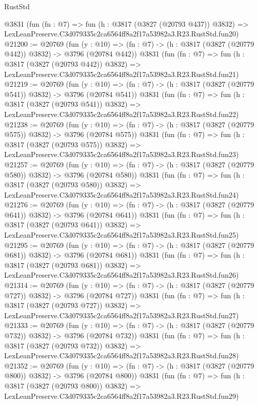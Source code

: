 \begin{lexlean}{RustStd}
\begin{coremodule}
    @3831
    (fun (fn : @7) =>
    fun (h : @3817 (@3827 (@20793 @437)) @3832) =>
    LexLeanPreserve.C3d079335c2ca6564ff8a2f17a53982a3.R23.RustStd.fun20)
@21200 := @20769
    (fun (y : @10) => (fn : @7) -> (h : @3817 (@3827 (@20779 @442)) @3832) -> @3796 (@20784 @442))
    @3831
    (fun (fn : @7) =>
    fun (h : @3817 (@3827 (@20793 @442)) @3832) =>
    LexLeanPreserve.C3d079335c2ca6564ff8a2f17a53982a3.R23.RustStd.fun21)
@21219 := @20769
    (fun (y : @10) => (fn : @7) -> (h : @3817 (@3827 (@20779 @541)) @3832) -> @3796 (@20784 @541))
    @3831
    (fun (fn : @7) =>
    fun (h : @3817 (@3827 (@20793 @541)) @3832) =>
    LexLeanPreserve.C3d079335c2ca6564ff8a2f17a53982a3.R23.RustStd.fun22)
@21238 := @20769
    (fun (y : @10) => (fn : @7) -> (h : @3817 (@3827 (@20779 @575)) @3832) -> @3796 (@20784 @575))
    @3831
    (fun (fn : @7) =>
    fun (h : @3817 (@3827 (@20793 @575)) @3832) =>
    LexLeanPreserve.C3d079335c2ca6564ff8a2f17a53982a3.R23.RustStd.fun23)
@21257 := @20769
    (fun (y : @10) => (fn : @7) -> (h : @3817 (@3827 (@20779 @580)) @3832) -> @3796 (@20784 @580))
    @3831
    (fun (fn : @7) =>
    fun (h : @3817 (@3827 (@20793 @580)) @3832) =>
    LexLeanPreserve.C3d079335c2ca6564ff8a2f17a53982a3.R23.RustStd.fun24)
@21276 := @20769
    (fun (y : @10) => (fn : @7) -> (h : @3817 (@3827 (@20779 @641)) @3832) -> @3796 (@20784 @641))
    @3831
    (fun (fn : @7) =>
    fun (h : @3817 (@3827 (@20793 @641)) @3832) =>
    LexLeanPreserve.C3d079335c2ca6564ff8a2f17a53982a3.R23.RustStd.fun25)
@21295 := @20769
    (fun (y : @10) => (fn : @7) -> (h : @3817 (@3827 (@20779 @681)) @3832) -> @3796 (@20784 @681))
    @3831
    (fun (fn : @7) =>
    fun (h : @3817 (@3827 (@20793 @681)) @3832) =>
    LexLeanPreserve.C3d079335c2ca6564ff8a2f17a53982a3.R23.RustStd.fun26)
@21314 := @20769
    (fun (y : @10) => (fn : @7) -> (h : @3817 (@3827 (@20779 @727)) @3832) -> @3796 (@20784 @727))
    @3831
    (fun (fn : @7) =>
    fun (h : @3817 (@3827 (@20793 @727)) @3832) =>
    LexLeanPreserve.C3d079335c2ca6564ff8a2f17a53982a3.R23.RustStd.fun27)
@21333 := @20769
    (fun (y : @10) => (fn : @7) -> (h : @3817 (@3827 (@20779 @732)) @3832) -> @3796 (@20784 @732))
    @3831
    (fun (fn : @7) =>
    fun (h : @3817 (@3827 (@20793 @732)) @3832) =>
    LexLeanPreserve.C3d079335c2ca6564ff8a2f17a53982a3.R23.RustStd.fun28)
@21352 := @20769
    (fun (y : @10) => (fn : @7) -> (h : @3817 (@3827 (@20779 @800)) @3832) -> @3796 (@20784 @800))
    @3831
    (fun (fn : @7) =>
    fun (h : @3817 (@3827 (@20793 @800)) @3832) =>
    LexLeanPreserve.C3d079335c2ca6564ff8a2f17a53982a3.R23.RustStd.fun29)

\end{coremodule}
\end{lexlean}
